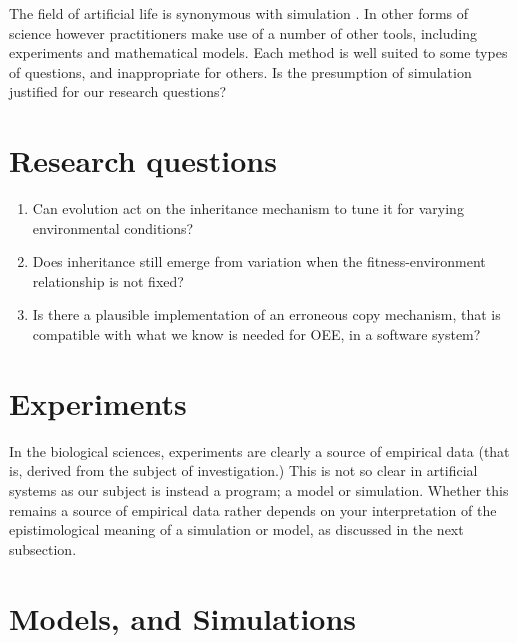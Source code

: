The field of artificial life is synonymous with simulation \parencite[chap.2]{Aicardi2010}. In other forms of science however practitioners make use of a number of other tools, including experiments and mathematical models. Each method is well suited to some types of questions, and inappropriate for others. Is the presumption of simulation justified for our research questions?

\section{Research questions}\label{research-questions}

\vspace{0.3cm}
\begin{minipage}[l]{0.95\textwidth}
	\begin{enumerate}[label=RQ\arabic*:]
		\item Can evolution act on the inheritance mechanism to tune it for varying environmental conditions?
		\item Does inheritance still emerge from variation when the fitness-environment relationship is not fixed?
		\item Is there a plausible implementation of an erroneous copy mechanism, that is compatible with what we know is needed for OEE, in a software system?
	\end{enumerate}
\end{minipage}
\vspace{0.3cm}

\section{Experiments}\label{experiments}

In the biological sciences, experiments are clearly a source of empirical data (that is, derived from the subject of investigation.) This is not so clear in artificial systems as our subject is instead a program; a model or simulation. Whether this remains a source of empirical data rather depends on your interpretation of the epistimological meaning of a simulation or model, as discussed in the next subsection.

\section{Models, and Simulations}\label{models}


